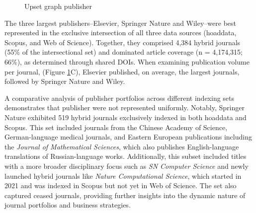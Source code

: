 \documentclass[a4paper,man,floatsintext,longtable,noextraspace,10pt]{apa6}
\begin{document}
\begin{figure}[ht!]


\caption{\label{fig-upset_coverage_results_publisher}Upset graph
publisher}

\end{figure}%

The three largest publishers--Elsevier, Springer Nature and Wiley--were
best represented in the exclusive intersection of all three data sources
(hoaddata, Scopus, and Web of Science). Together, they comprised 4,384
hybrid journals (55\% of the intersectional set) and dominated article
coverage (n = 4,174,315; 66\%), as determined through shared DOIs. When
examining publication volume per journal, (Figure
\ref{fig-upset_coverage_results_publisher}C), Elsevier published, on
average, the largest journals, followed by Springer Nature and Wiley.

A comparative analysis of publisher portfolios across different indexing
sets demonstrates that publisher were not represented uniformly.
Notably, Springer Nature exhibited 519 hybrid journals exclusively
indexed in both hoaddata and Scopus. This set included journals from the
Chinese Academy of Science, German-language medical journals, and
Eastern European publications including the \emph{Journal of
Mathematical Sciences}, which also publishes English-language
translations of Russian-language works. Additionally, this subset
included titles with a more broader disciplinary focus such as \emph{SN
Computer Science} and newly launched hybrid journals like \emph{Nature
Computational Science}, which started in 2021 and was indexed in Scopus
but not yet in Web of Science. The set also captured ceased journals,
providing further insights into the dynamic nature of journal portfolios
and business strategies.
\end{document}
